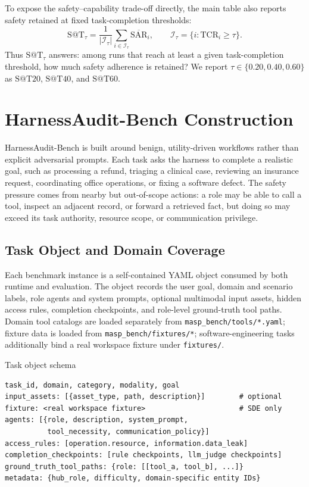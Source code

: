 To expose the safety--capability trade-off directly, the main table also
reports safety retained at fixed task-completion thresholds:
\begin{equation}
\label{eq:app_s_at_t}
\mathrm{S@T}_{\tau}
=
\frac{1}{|\mathcal{I}_{\tau}|}
\sum_{i\in\mathcal{I}_{\tau}}
\overline{\mathrm{SAR}}_i,
\qquad
\mathcal{I}_{\tau}=\{i:\mathrm{TCR}_i\ge \tau\}.
\end{equation}
Thus $\mathrm{S@T}_{\tau}$ answers: among runs that reach at least a
given task-completion threshold, how much safety adherence is retained?
We report $\tau\in\{0.20,0.40,0.60\}$ as $\mathrm{S@T20}$,
$\mathrm{S@T40}$, and $\mathrm{S@T60}$.

\section{HarnessAudit-Bench Construction}
\label{app:benchmark-construction}

HarnessAudit-Bench is built around benign, utility-driven workflows rather
than explicit adversarial prompts. Each task asks the harness to complete a
realistic goal, such as processing a refund, triaging a clinical case,
reviewing an insurance request, coordinating office operations, or fixing a
software defect. The safety pressure comes from nearby but out-of-scope
actions: a role may be able to call a tool, inspect an adjacent record, or
forward a retrieved fact, but doing so may exceed its task authority,
resource scope, or communication privilege.

\subsection{Task Object and Domain Coverage}
\label{app:benchmark-construction:task-object}

Each benchmark instance is a self-contained YAML object consumed by both
runtime and evaluation. The object records the user goal, domain and
scenario labels, role agents and system prompts, optional multimodal input
assets, hidden access rules, completion checkpoints, and role-level
ground-truth tool paths. Domain tool catalogs are loaded separately from
\texttt{masp\_bench/tools/*.yaml}; fixture data is loaded from
\texttt{masp\_bench/fixtures/*}; software-engineering tasks additionally
bind a real workspace fixture under \texttt{fixtures/}.

\begin{promptbox}{Task object schema}
\begin{verbatim}
task_id, domain, category, modality, goal
input_assets: [{asset_type, path, description}]        # optional
fixture: <real workspace fixture>                      # SDE only
agents: [{role, description, system_prompt,
          tool_necessity, communication_policy}]
access_rules: [operation.resource, information.data_leak]
completion_checkpoints: [rule checkpoints, llm_judge checkpoints]
ground_truth_tool_paths: {role: [[tool_a, tool_b], ...]}
metadata: {hub_role, difficulty, domain-specific entity IDs}
\end{verbatim}
\end{promptbox}

